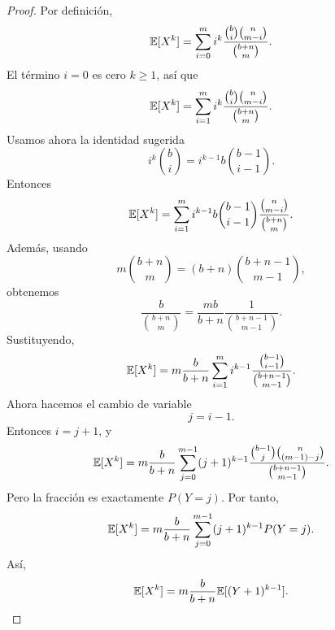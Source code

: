 \documentclass[12pt,a4paper]{article}
\begin{document}
    \begin{proof}
        Por definición,
        \begin{equation*}
            \mathbb{E}[X^{k}]=\sum_{i=0}^{m}i^{k}\frac{\binom{b}{i}\binom{n}{m-i}}{\binom{b+n}{m}}.
        \end{equation*}
        El término $i=0$ es cero $k\geq1$, así que
        \begin{equation*}
            \mathbb{E}[X^{k}]=\sum_{i=1}^{m}i^{k}\frac{\binom{b}{i}\binom{n}{m-i}}{\binom{b+n}{m}}.
        \end{equation*}
        Usamos ahora la identidad sugerida
        \begin{equation*}
            i^{k}\binom{b}{i}=i^{k-1}b\binom{b-1}{i-1}.
        \end{equation*}
        Entonces
        \begin{equation*}
            \mathbb{E}[X^{k}]=\sum_{i=1}^{m}i^{k-1}b\binom{b-1}{i-1}\frac{\binom{n}{m-i}}{\binom{b+n}{m}}.
        \end{equation*}
        Además, usando
        \begin{equation*}
            m\binom{b+n}{m}=(b+n)\binom{b+n-1}{m-1},
        \end{equation*}
        obtenemos
        \begin{equation*}
            \frac{b}{\binom{b+n}{m}}=\frac{mb}{b+n}\frac{1}{\binom{b+n-1}{m-1}}.
        \end{equation*}
        Sustituyendo,
        \begin{equation*}
            \mathbb{E}[X^{k}]=m\frac{b}{b+n}\sum_{i=1}^{m}i^{k-1}\frac{\binom{b-1}{i-1}}{\binom{b+n-1}{m-1}}.
        \end{equation*}
        Ahora hacemos el cambio de variable
        \begin{equation*}
            j=i-1.
        \end{equation*}
        Entonces $i=j+1$, y
        \begin{equation*}
            \mathbb{E}[X^{k}]=m\frac{b}{b+n}\sum_{j=0}^{m-1}(j+1)^{k-1}\frac{\binom{b-1}{j}\binom{n}{(m-1)-j}}{\binom{b+n-1}{m-1}}.
        \end{equation*}
        Pero la fracción es exactamente $P(Y=j)$. Por tanto,
        \begin{equation*}
            \mathbb{E}[X^{k}]=m\frac{b}{b+n}\sum_{j=0}^{m-1}(j+1)^{k-1}P(Y=j).
        \end{equation*}
        Así,
        \begin{equation*}
            \E[X^{k}]=m\frac{b}{b+n}\E[(Y+1)^{k-1}].

\end{equation*}
\end{proof}
\end{document}
